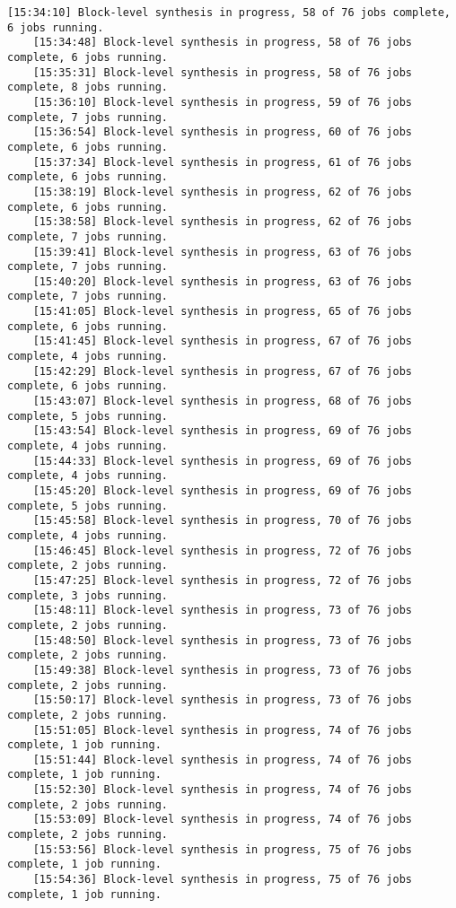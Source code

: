 \begin{lstlisting}[caption=Содержимое файла v++\_vinc.log, label={log1}]
	[15:34:10] Block-level synthesis in progress, 58 of 76 jobs complete, 6 jobs running.
	[15:34:48] Block-level synthesis in progress, 58 of 76 jobs complete, 6 jobs running.
	[15:35:31] Block-level synthesis in progress, 58 of 76 jobs complete, 8 jobs running.
	[15:36:10] Block-level synthesis in progress, 59 of 76 jobs complete, 7 jobs running.
	[15:36:54] Block-level synthesis in progress, 60 of 76 jobs complete, 6 jobs running.
	[15:37:34] Block-level synthesis in progress, 61 of 76 jobs complete, 6 jobs running.
	[15:38:19] Block-level synthesis in progress, 62 of 76 jobs complete, 6 jobs running.
	[15:38:58] Block-level synthesis in progress, 62 of 76 jobs complete, 7 jobs running.
	[15:39:41] Block-level synthesis in progress, 63 of 76 jobs complete, 7 jobs running.
	[15:40:20] Block-level synthesis in progress, 63 of 76 jobs complete, 7 jobs running.
	[15:41:05] Block-level synthesis in progress, 65 of 76 jobs complete, 6 jobs running.
	[15:41:45] Block-level synthesis in progress, 67 of 76 jobs complete, 4 jobs running.
	[15:42:29] Block-level synthesis in progress, 67 of 76 jobs complete, 6 jobs running.
	[15:43:07] Block-level synthesis in progress, 68 of 76 jobs complete, 5 jobs running.
	[15:43:54] Block-level synthesis in progress, 69 of 76 jobs complete, 4 jobs running.
	[15:44:33] Block-level synthesis in progress, 69 of 76 jobs complete, 4 jobs running.
	[15:45:20] Block-level synthesis in progress, 69 of 76 jobs complete, 5 jobs running.
	[15:45:58] Block-level synthesis in progress, 70 of 76 jobs complete, 4 jobs running.
	[15:46:45] Block-level synthesis in progress, 72 of 76 jobs complete, 2 jobs running.
	[15:47:25] Block-level synthesis in progress, 72 of 76 jobs complete, 3 jobs running.
	[15:48:11] Block-level synthesis in progress, 73 of 76 jobs complete, 2 jobs running.
	[15:48:50] Block-level synthesis in progress, 73 of 76 jobs complete, 2 jobs running.
	[15:49:38] Block-level synthesis in progress, 73 of 76 jobs complete, 2 jobs running.
	[15:50:17] Block-level synthesis in progress, 73 of 76 jobs complete, 2 jobs running.
	[15:51:05] Block-level synthesis in progress, 74 of 76 jobs complete, 1 job running.
	[15:51:44] Block-level synthesis in progress, 74 of 76 jobs complete, 1 job running.
	[15:52:30] Block-level synthesis in progress, 74 of 76 jobs complete, 2 jobs running.
	[15:53:09] Block-level synthesis in progress, 74 of 76 jobs complete, 2 jobs running.
	[15:53:56] Block-level synthesis in progress, 75 of 76 jobs complete, 1 job running.
	[15:54:36] Block-level synthesis in progress, 75 of 76 jobs complete, 1 job running.

\end{lstlisting}
